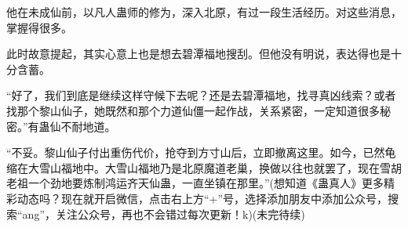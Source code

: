 \begin{this_body}
他在未成仙前，以凡人蛊师的修为，深入北原，有过一段生活经历。对这些消息，掌握得很多。

此时故意提起，其实心意上也是想去碧潭福地搜刮。但他没有明说，表达得也是十分含蓄。

“好了，我们到底是继续这样守候下去呢？还是去碧潭福地，找寻真凶线索？或者找那个黎山仙子，她既然和那个力道仙僵一起作战，关系紧密，一定知道很多秘密。”有蛊仙不耐地道。

“不妥。黎山仙子付出重伤代价，抢夺到方寸山后，立即撤离这里。如今，已然龟缩在大雪山福地中。大雪山福地乃是北原魔道老巢，换做以往也就罢了，现在雪胡老祖一个劲地要炼制鸿运齐天仙蛊，一直坐镇在那里。”(想知道《蛊真人》更多精彩动态吗？现在就开启微信，点击右上方“+”号，选择添加朋友中添加公众号，搜索“ang”，关注公众号，再也不会错过每次更新！k)(未完待续)

\end{this_body}

